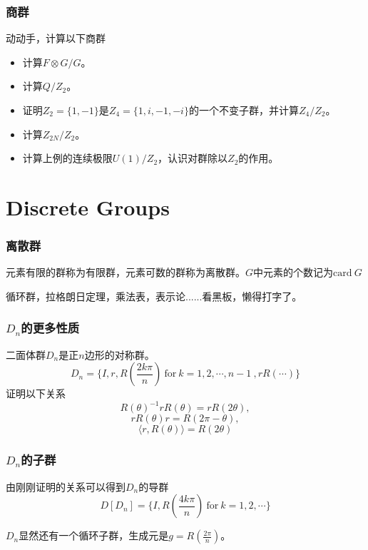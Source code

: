 \documentclass[CJK]{beamer}
\newcommand{\card}{\mathrm{card \ }}
\begin{document}
\begin{frame}
\frametitle{\bch 商群 \ech}
\bch
动动手，计算以下商群
\begin{itemize}
\item 计算$F\otimes G/G$。
\item  计算$Q/Z_2$。
\item 证明$Z_2 = \{1,-1\}$是$Z_4 = \{1,i,-1,-i\}$的一个不变子群，并计算$Z_4/Z_2$。
\item 计算$Z_{2N}/Z_2$。
\item 计算上例的连续极限$U(1)/Z_2$，认识对群除以$Z_2$的作用。
\end{itemize}


\ech
\end{frame}





\section{Discrete Groups}
\begin{frame}
\frametitle{\bch 离散群 \ech}
\bch
元素有限的群称为有限群，元素可数的群称为离散群。$G$中元素的个数记为$\card G$\par
循环群，拉格朗日定理，乘法表，表示论......看黑板，懒得打字了。


\ech
\end{frame}

\begin{frame}
\frametitle{\bch $D_n$的更多性质 \ech}
\bch
二面体群$D_n$是正$n$边形的对称群。
$$
D_n = \{I, r, R\left(\frac{2k\pi}{n}\right) \ \mathrm{for}\ k=1,2,\cdots,n-1 \ ,rR(\cdots)\}
$$
证明以下关系
$$R(\theta)^{-1} r R(\theta) = r R(2\theta),$$
$$rR(\theta) r = R(2\pi - \theta),$$
$$\langle r , R(\theta) \rangle = R(2\theta)$$

\ech
\end{frame}

\begin{frame}
\frametitle{\bch $D_n$的子群 \ech}
\bch
由刚刚证明的关系可以得到$D_n$的导群
$$D[D_n] = \{I,R\left(\frac{4k\pi}{n}\right) \ \mathrm{for}\ k=1,2,\cdots\}$$
\par
$D_n$显然还有一个循环子群，生成元是$g = R\left(\frac{2\pi}{n}\right)$。

\ech
\end{frame}
\end{document}
